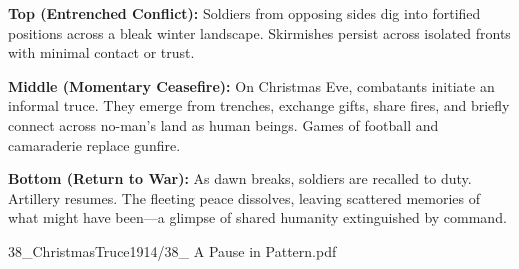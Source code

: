 \begin{SideNotePage}{
  \textbf{Top (Entrenched Conflict):} Soldiers from opposing sides dig into fortified positions across a bleak winter landscape. Skirmishes persist across isolated fronts with minimal contact or trust. \par

  \textbf{Middle (Momentary Ceasefire):} On Christmas Eve, combatants initiate an informal truce. They emerge from trenches, exchange gifts, share fires, and briefly connect across no-man’s land as human beings. Games of football and camaraderie replace gunfire. \par

  \textbf{Bottom (Return to War):} As dawn breaks, soldiers are recalled to duty. Artillery resumes. The fleeting peace dissolves, leaving scattered memories of what might have been—a glimpse of shared humanity extinguished by command. \par
}{38_ChristmasTruce1914/38_ A Pause in Pattern.pdf}
\end{SideNotePage}
